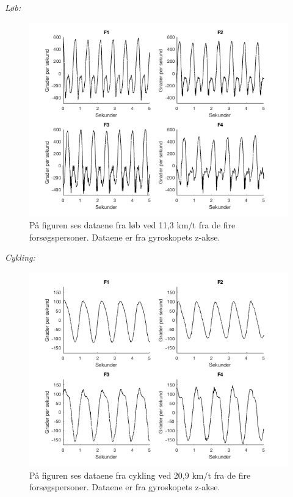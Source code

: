 \textit{Løb:}
\begin{figure}[H]
	\centering
	\includegraphics[scale=0.5]{figures/qBilag/loeb_gyro}
	\caption{På figuren ses dataene fra løb ved 11,3 km/t fra de fire forsøgspersoner. Dataene er fra gyroskopets z-akse.}
	\label{fig:Ap_cykling2}
\end{figure}

\textit{Cykling:}
\begin{figure}[H]
	\centering
	\includegraphics[scale=0.5]{figures/qBilag/cykling_gyro}
	\caption{På figuren ses dataene fra cykling ved 20,9 km/t fra de fire forsøgspersoner. Dataene er fra gyroskopets z-akse.}
	\label{fig:Ap_cykling3}
\end{figure}

